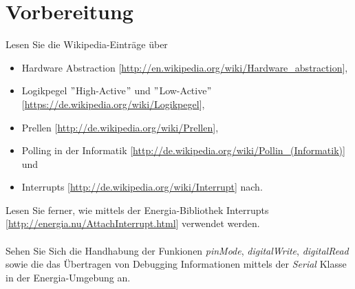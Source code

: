 \newpage
\section{Vorbereitung}
Lesen Sie die Wikipedia-Einträge über
\begin{itemize}
	\item Hardware Abstraction [\url{http://en.wikipedia.org/wiki/Hardware\_abstraction}],
	\item Logikpegel $"$High-Active$"$ und $"$Low-Active$"$ [\url{https://de.wikipedia.org/wiki/Logikpegel}],
	\item Prellen [\url{http://de.wikipedia.org/wiki/Prellen}],
	\item Polling in der Informatik [\url{http://de.wikipedia.org/wiki/Pollin\_(Informatik)}] und
	\item Interrupts [\url{http://de.wikipedia.org/wiki/Interrupt}] nach.\\
\end{itemize}
Lesen Sie ferner, wie mittels der Energia-Bibliothek Interrupts [\url{http://energia.nu/AttachInterrupt.html}] verwendet werden.\\ \\
Sehen Sie Sich die Handhabung der Funkionen \textit{pinMode}, \textit{digitalWrite}, \textit{digitalRead} sowie die das Übertragen von Debugging Informationen mittels der \textit{Serial} Klasse in der Energia-Umgebung an.\\ \\
